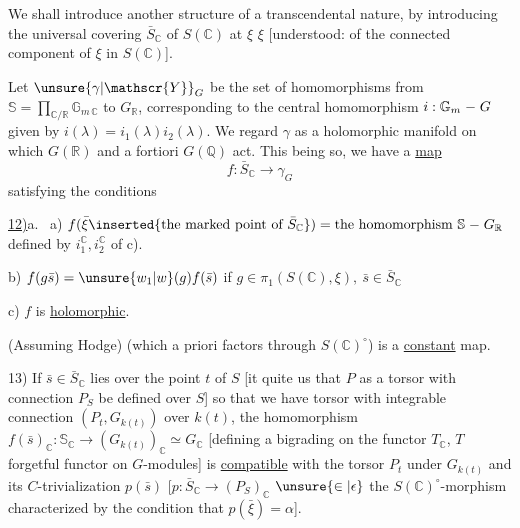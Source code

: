 We shall introduce another structure of a transcendental nature, by introducing the universal covering $\bar S_{\mathbb C}$ of $S(\mathbb C)$ at $\xi$ $\xi$ [understood: of the connected component of $\xi$ in $S(\mathbb C)$].

Let $\unsure{\gamma|\mathscr{Y}}_{G}$ be the set of homomorphisms from $\mathbb S=\prod_{\mathbb C/\mathbb R}\mathbb G_{m\,\mathbb C}$ to $G_{\mathbb R}$, corresponding to the central homomorphism  $i:\mathbb G_m \relbar G$ given by $i(\lambda)=i_1(\lambda)i_2(\lambda)$. \margin{\rule{0.35pt}{2.1\baselineskip}}We regard $\gamma$ as a  holomorphic manifold on which  $G(\mathbb R)$ and a fortiori $G(\mathbb Q)$ act. This being so, we have a \uline{map}
\[
\boxed{f:\bar S_{\mathbb C}\longrightarrow\gamma_G}
\]
satisfying the conditions

\uline{12)}a. \ a) $f(\bar\xi\inserted{\text{the marked point of }\bar S_{\mathbb C}})={}\text{the homomorphism }\mathbb S\relbar G_{\mathbb R}$ defined by $i_1^{\mathbb C},i_2^{\mathbb C}$ of c).

b) $f(g\bar s)=\unsure{w_{1}|w}(g)f(\bar s)$ if $g\in\pi_1(S(\mathbb C),\xi),\ \bar s\in\bar S_{\mathbb C}$

c) $f$ is \uline{holomorphic}.

 (Assuming Hodge)   (which a priori  factors through  $S(\mathbb C)^{\circ}$) is a \uline{constant} map.

13) If $\bar s\in\bar S_{\mathbb C}$ lies over the point $t$ of $S$ [it quite  us that $P$ as a torsor with  connection $P_S$ be defined over $S$] so that we have torsor with integrable connection  $(P_t,G_{k(t)})$ over $k(t)$,  the homomorphism $f(\bar s)_{\mathbb C}:\mathbb S_{\mathbb C}\longrightarrow(G_{k(t)})_{\mathbb C}\simeq G_{\mathbb C}$ [defining a bigrading on the functor $T_{\mathbb C}$, $T$ forgetful functor on $G$-modules] is \uline{compatible} with the torsor $P_t$ under $G_{k(t)}$ and its $C$-trivialization $p(\bar s)$ [$p:\bar S_{\mathbb C}\longrightarrow(P_S)_{\mathbb C}$ $\unsure{\in|\epsilon}$  the $S(\mathbb C)^{\circ}$-morphism characterized by the condition that $p(\bar\xi)=\alpha$].
